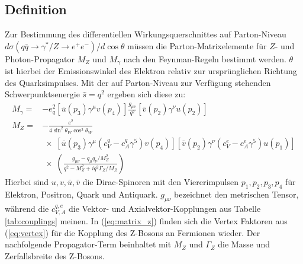 \subsection{Definition}
\label{theory:afb_definition}

Zur Bestimmung des differentiellen Wirkungsquerschnittes auf Parton-Niveau
\linebreak
\mbox{$d\sigma(q\bar q \rightarrow \gamma^*/Z \rightarrow e^+e^-)/d\cos\theta$}
müssen die Parton-Matrixelemente für $Z$- und Photon-Propagator $M_Z$ und
$M_\gamma$ nach den Feynman-Regeln bestimmt werden. $\theta$ ist hierbei der
Emissionswinkel des Elektron relativ zur ursprünglichen Richtung des
Quarksimpulses. Mit der auf Parton-Niveau zur Verfügung stehenden
Schwerpunktsenergie $\hat s=q^2$ ergeben sich diese zu:
\begin{align}
    M_\gamma = &-e_q^2
                \left[ \bar u(p_3) \gamma^\mu v(p_4) \right]
                \frac{g_{\mu\nu}}{q^2}
                \left[ \bar v(p_2) \gamma^\nu u(p_2) \right]
                \label{eq:matrix_gamma} \\[5pt]
    M_Z      = &-\frac{e^2}{4\sin^2\theta_W\cos^2\theta_W}
                \nonumber \\[3pt] &\;\times\;
                \left[ \bar u(p_3)\gamma^\mu(c_V^q-c_A^q\gamma^5)v(p_4)\right]
                \left[ \bar v(p_2)\gamma^\nu(c_V^e-c_A^e\gamma^5)u(p_1)\right]
                \label{eq:matrix_z} \\ &\;\times\;
                \left( \frac{g_{\mu\nu} - q_\mu q_\nu/M_Z^2}{q^2 - M_Z^2 +iq^2
                \Gamma_Z/M_Z}  \right) \nonumber
\end{align}
Hierbei sind $u,v,\bar u, \bar v$ die Dirac-Spinoren mit den Viererimpulsen
$p_1,p_2,p_3,p_4$ für Elektron, Positron, Quark und Antiquark. $g_{\mu\nu}$
bezeichnet den metrischen Tensor, während die $c_{V,A}^{q,e}$ die Vektor- und
Axialvektor-Kopplungen aus Tabelle \ref{tab:couplings} meinen. In
(\ref{eq:matrix_z}) finden sich die Vertex Faktoren aus (\ref{eq:vertex}) für
die Kopplung des Z-Bosons an Fermionen wieder. Der nachfolgende Propagator-Term
beinhaltet mit $M_Z$ und $\Gamma_Z$ die Masse und Zerfallsbreite des Z-Bosons.

\pagebreak

